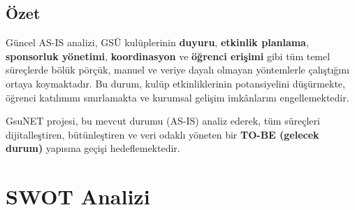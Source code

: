 \documentclass[a4paper,12pt]{report}
\begin{document}
\subsection{Özet}

Güncel AS-IS analizi, GSÜ kulüplerinin \textbf{duyuru}, \textbf{etkinlik planlama}, \textbf{sponsorluk yönetimi}, \textbf{koordinasyon} ve \textbf{öğrenci erişimi} gibi tüm temel süreçlerde bölük pörçük, manuel ve veriye dayalı olmayan yöntemlerle çalıştığını ortaya koymaktadır. Bu durum, kulüp etkinliklerinin potansiyelini düşürmekte, öğrenci katılımını sınırlamakta ve kurumsal gelişim imkânlarını engellemektedir.

GsuNET projesi, bu mevcut durumu (AS-IS) analiz ederek, tüm süreçleri dijitalleştiren, bütünleştiren ve veri odaklı yöneten bir \textbf{TO-BE (gelecek durum)} yapısına geçişi hedeflemektedir.

\section{SWOT Analizi}
\end{document}
